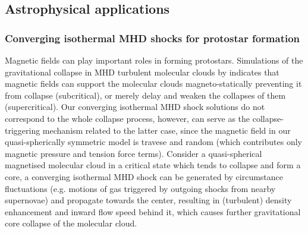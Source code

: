 \documentclass[fleqn,usenatbib]{mnras}
\begin{document}



\subsection{Astrophysical applications}
\label{s6.2}
\subsubsection{Converging isothermal MHD shocks for protostar formation}
\label{s6.2.1}


Magnetic fields can play important roles in forming protostars. Simulations of the gravitational collapse in MHD turbulent molecular clouds by \citet{heitsch2001gravitational} indicates that magnetic fields can support the molecular clouds magneto-statically preventing it from collapse (subcritical), or merely delay and weaken the collapses of them (supercritical). Our converging isothermal MHD shock solutions do not correspond to the whole collapse process, however, can serve as the collapse-triggering mechanism related to the latter case, since the magnetic field in our quasi-spherically symmetric model is travese and random (which contributes only magnetic pressure and tension force terms). Consider a quasi-spherical magnetised molecular cloud in a critical state which tends to collapse and form a core, a converging isothermal MHD shock can be generated by circumstance fluctuations (e.g. motions of gas triggered by outgoing shocks from nearby supernovae) and propagate towards the center, resulting in (turbulent) density enhancement and inward flow speed behind it, which causes further gravitational core collapse of the molecular cloud. 
\end{document}
